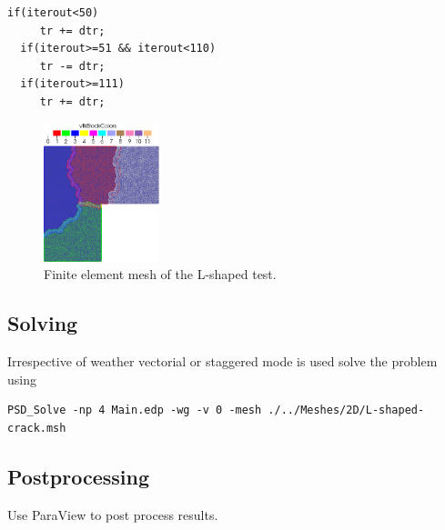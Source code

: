 \begin{itemize}
\begin{lstlisting}[style=CppStyle]
  if(iterout<50)
     tr += dtr;
  if(iterout>=51 && iterout<110)
     tr -= dtr;
  if(iterout>=111)
     tr += dtr;
\end{lstlisting}

\begin{figure}[h!]
\centering
\includegraphics[width=0.3\textwidth]{./Images/fm-mesh.png}
\caption{Finite element mesh of the L-shaped test. \label{L-shape-mesh}}
\end{figure}

\end{itemize}

\subsection{Solving}

Irrespective of weather vectorial or staggered mode is used solve the
problem using 

\begin{lstlisting}[style=BashInputStyle]
PSD_Solve -np 4 Main.edp -wg -v 0 -mesh ./../Meshes/2D/L-shaped-crack.msh
\end{lstlisting}

\subsection{Postprocessing}

Use ParaView to post process results.

